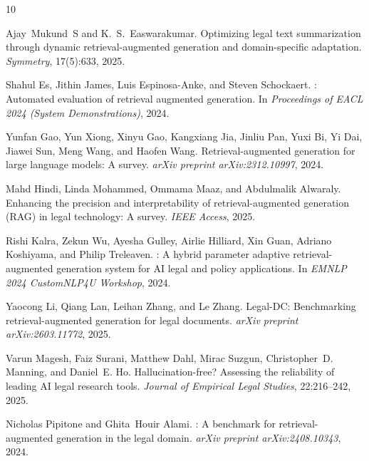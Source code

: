 \documentclass{article}
\begin{document}
{\small



\begin{thebibliography}{10}

Ajay~Mukund~S and K.~S.~Easwarakumar.
\newblock Optimizing legal text summarization through dynamic retrieval-augmented generation and domain-specific adaptation.
\newblock \emph{Symmetry}, 17(5):633, 2025.

Shahul Es, Jithin James, Luis Espinosa-Anke, and Steven Schockaert.
: Automated evaluation of retrieval augmented generation.
\newblock In \emph{Proceedings of EACL 2024 (System Demonstrations)}, 2024.

Yunfan Gao, Yun Xiong, Xinyu Gao, Kangxiang Jia, Jinliu Pan, Yuxi Bi, Yi Dai, Jiawei Sun, Meng Wang, and Haofen Wang.
\newblock Retrieval-augmented generation for large language models: A survey.
\newblock \emph{arXiv preprint arXiv:2312.10997}, 2024.

Mahd Hindi, Linda Mohammed, Ommama Maaz, and Abdulmalik Alwaraly.
\newblock Enhancing the precision and interpretability of retrieval-augmented generation ({RAG}) in legal technology: A survey.
\newblock \emph{IEEE Access}, 2025.

Rishi Kalra, Zekun Wu, Ayesha Gulley, Airlie Hilliard, Xin Guan, Adriano Koshiyama, and Philip Treleaven.
: A hybrid parameter adaptive retrieval-augmented generation system for {AI} legal and policy applications.
\newblock In \emph{EMNLP 2024 CustomNLP4U Workshop}, 2024.

Yaocong Li, Qiang Lan, Leihan Zhang, and Le Zhang.
\newblock Legal-{DC}: Benchmarking retrieval-augmented generation for legal documents.
\newblock \emph{arXiv preprint arXiv:2603.11772}, 2025.

Varun Magesh, Faiz Surani, Matthew Dahl, Mirac Suzgun, Christopher~D. Manning, and Daniel~E. Ho.
\newblock Hallucination-free? {Assessing} the reliability of leading {AI} legal research tools.
\newblock \emph{Journal of Empirical Legal Studies}, 22:216--242, 2025.

Nicholas Pipitone and Ghita~Houir Alami.
: A benchmark for retrieval-augmented generation in the legal domain.
\newblock \emph{arXiv preprint arXiv:2408.10343}, 2024.


\end{thebibliography}}
\end{document}
